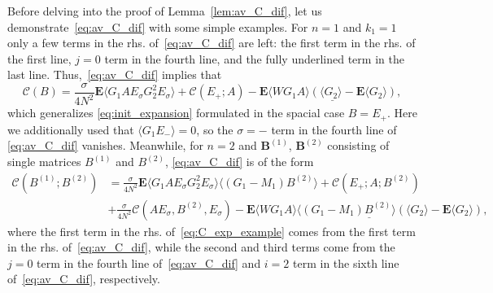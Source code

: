 \documentclass[10pt]{amsart}
\numberwithin{equation}{section}
\newcommand{\E}{\mathbf{E}}
\begin{document}
Before delving into the proof of Lemma~\ref{lem:av_C_dif}, let us demonstrate~\eqref{eq:av_C_dif} with some simple examples. For $n=1$ and $k_1=1$ only a few terms in the rhs. of~\eqref{eq:av_C_dif} are left: the first term in the rhs. of the first line, $j=0$ term in the fourth line, and the fully underlined term in the last line. Thus,~\eqref{eq:av_C_dif} implies that
\begin{equation*}
\mathcal{C}(B) =  \frac{\sigma}{4N^2} \E\langle G_1AE_\sigma G_2^2E_\sigma\rangle + \mathcal{C}(E_+;A) - \E\underline{\langle WG_1A\rangle \left(\langle G_2\rangle -\E \langle G_2\rangle\right)},
\end{equation*}
which generalizes \eqref{eq:init_expansion} formulated in the spacial case $B=E_+$. Here we additionally used that $\langle G_1E_-\rangle=0$, so the $\sigma=-$ term in the fourth line of \eqref{eq:av_C_dif} vanishes. Meanwhile, for $n=2$ and $\bm{B}^{(1)}$, $\bm{B}^{(2)}$ consisting of single matrices $B^{(1)}$ and $B^{(2)}$, \eqref{eq:av_C_dif} is of the form
\begin{equation}
\begin{split}
\mathcal{C}(B^{(1)};B^{(2)})& = \frac{\sigma}{4N^2}\E\langle G_1AE_\sigma G_2^2 E_\sigma\rangle\langle (G_1-M_1)B^{(2)}\rangle + \mathcal{C}(E_+;A;B^{(2)})\\
&+\frac{\sigma}{4N^2}\mathcal{C}(AE_\sigma, B^{(2)}, E_\sigma) - \E\underline{\langle WG_1A\rangle \langle (G_1-M_1)B^{(2)}\rangle\left(\langle G_2\rangle -\E \langle G_2\rangle\right)},
\end{split}
\label{eq:C_exp_example}
\end{equation}
where the first term in the rhs. of~\eqref{eq:C_exp_example} comes from the first term in the rhs. of~\eqref{eq:av_C_dif}, while the second and third terms come from the $j=0$ term in the fourth line of~\eqref{eq:av_C_dif} and $i=2$ term in the sixth line of~\eqref{eq:av_C_dif}, respectively. 
\end{document}
